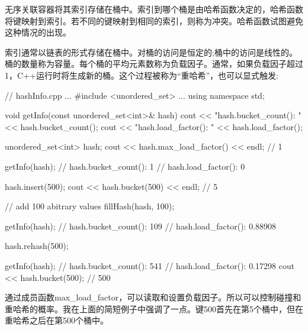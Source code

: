 
无序关联容器将其索引存储在桶中。索引到哪个桶是由哈希函数决定的，哈希函数将键映射到索引。若不同的键映射到相同的索引，则称为冲突。哈希函数试图避免这种情况的出现。

索引通常以链表的形式存储在桶中。对桶的访问是恒定的;桶中的访问是线性的。桶的数量称为容量。每个桶的平均元素数称为负载因子。通常，如果负载因子超过1，C++运行时将生成新的桶。这个过程被称为“重哈希”，也可以显式触发:


\begin{cpp}
// hashInfo.cpp
...
#include <unordered_set>
...
using namespace std;

void getInfo(const unordered_set<int>& hash){
	cout << "hash.bucket_count(): " << hash.bucket_count();
	cout << "hash.load_factor(): " << hash.load_factor();
}

unordered_set<int> hash;
cout << hash.max_load_factor() << endl; // 1

getInfo(hash);
	// hash.bucket_count(): 1
	// hash.load_factor(): 0

hash.insert(500);
cout << hash.bucket(500) << endl; // 5

// add 100 abitrary values
fillHash(hash, 100);

getInfo(hash);
	// hash.bucket_count(): 109
	// hash.load_factor(): 0.88908

hash.rehash(500);

getInfo(hash);
	// hash.bucket_count(): 541
	// hash.load_factor(): 0.17298
cout << hash.bucket(500); // 500
\end{cpp}

通过成员函数max\_load\_factor，可以读取和设置负载因子。所以可以控制碰撞和重哈希的概率。我在上面的简短例子中强调了一点。键500首先在第5个桶中，但在重哈希之后在第500个桶中。















